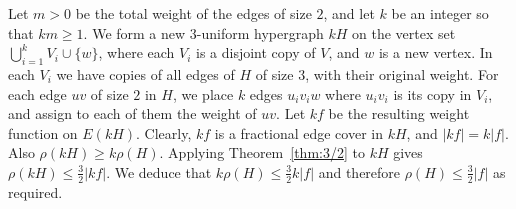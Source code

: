 \documentclass[10pt,a4paper]{amsart}
\begin{document}
Let $m > 0$ be the total weight of the edges of size $2$, and let $k$ be an integer so that $km \ge 1$. We form a new $3$-uniform hypergraph $kH$ on the vertex set $\bigcup _{i=1}^k V_i \cup \{w\}$, where each $V_i$ is a disjoint copy of $V$, and $w$ is a new vertex. In each $V_i$ we have copies of all edges of $H$ of size $3$, with their original weight. For each edge $uv$ of size $2$ in $H$, we place $k$ edges $u_iv_iw$ where $u_iv_i$ is its copy in $V_i$, and assign to each of them the weight of $uv$. Let $kf$ be the resulting weight function on $E(kH)$. Clearly, $kf$ is a fractional edge cover in $kH$, and $|kf| = k|f|$. Also $\rho(kH) \ge k\rho(H)$. Applying Theorem~\ref{thm:3/2} to $kH$ gives $\rho(kH) \le \frac{3}{2} |kf|$. We deduce that $k\rho(H) \le \frac{3}{2} k|f|$ and therefore $\rho(H) \le \frac{3}{2} |f|$ as required.
\end{document}
